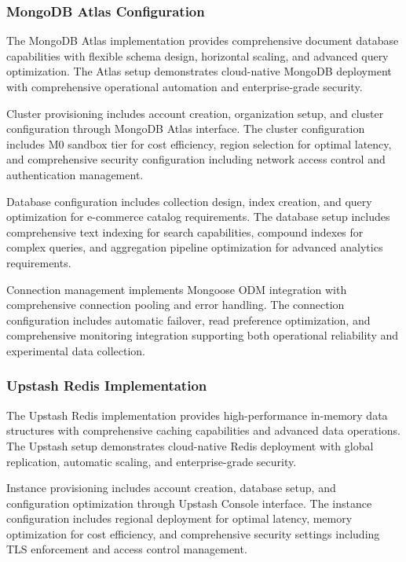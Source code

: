 \subsubsection{MongoDB Atlas Configuration}

The MongoDB Atlas implementation provides comprehensive document database capabilities with flexible schema design, horizontal scaling, and advanced query optimization. The Atlas setup demonstrates cloud-native MongoDB deployment with comprehensive operational automation and enterprise-grade security.

Cluster provisioning includes account creation, organization setup, and cluster configuration through MongoDB Atlas interface. The cluster configuration includes M0 sandbox tier for cost efficiency, region selection for optimal latency, and comprehensive security configuration including network access control and authentication management.

Database configuration includes collection design, index creation, and query optimization for e-commerce catalog requirements. The database setup includes comprehensive text indexing for search capabilities, compound indexes for complex queries, and aggregation pipeline optimization for advanced analytics requirements.

Connection management implements Mongoose ODM integration with comprehensive connection pooling and error handling. The connection configuration includes automatic failover, read preference optimization, and comprehensive monitoring integration supporting both operational reliability and experimental data collection.

\subsubsection{Upstash Redis Implementation}

The Upstash Redis implementation provides high-performance in-memory data structures with comprehensive caching capabilities and advanced data operations. The Upstash setup demonstrates cloud-native Redis deployment with global replication, automatic scaling, and enterprise-grade security.

Instance provisioning includes account creation, database setup, and configuration optimization through Upstash Console interface. The instance configuration includes regional deployment for optimal latency, memory optimization for cost efficiency, and comprehensive security settings including TLS enforcement and access control management.

